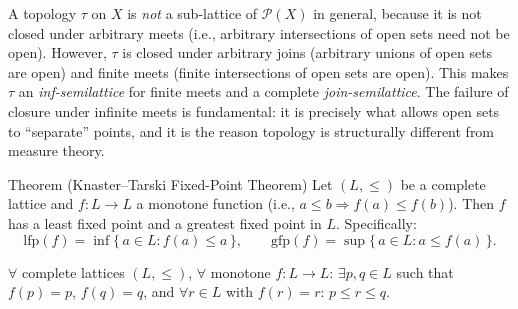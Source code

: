 \begin{remark*}
\label{rem:topology-lattice}
A topology $\tau$ on $X$ is \emph{not} a sub-lattice of $\mathcal{P}(X)$ in
general, because it is not closed under arbitrary meets (i.e., arbitrary
intersections of open sets need not be open).  However, $\tau$ is closed under
arbitrary joins (arbitrary unions of open sets are open) and finite meets
(finite intersections of open sets are open).  This makes $\tau$ an
\emph{inf-semilattice} for finite meets and a complete \emph{join-semilattice}.
The failure of closure under infinite meets is fundamental: it is precisely
what allows open sets to ``separate'' points, and it is the reason topology
is structurally different from measure theory.
\end{remark*}


\begin{theorembox}{Theorem (Knaster--Tarski Fixed-Point Theorem)}
\label{thm:knaster-tarski}
Let $(L, \leq)$ be a complete lattice and $f : L \to L$ a monotone
function (i.e., $a \leq b \Rightarrow f(a) \leq f(b)$).  Then $f$ has a
least fixed point and a greatest fixed point in $L$.  Specifically:
\[
  \mathrm{lfp}(f) = \inf\{\, a \in L : f(a) \leq a \,\},
  \qquad
  \mathrm{gfp}(f) = \sup\{\, a \in L : a \leq f(a) \,\}.
\]
\end{theorembox}

\begin{remark*}
$\forall$ complete lattices $(L,\leq)$, $\forall$ monotone $f : L \to L$:
$\exists p, q \in L$ such that $f(p) = p$, $f(q) = q$, and $\forall r \in L$
with $f(r) = r$: $p \leq r \leq q$.
\end{remark*}

